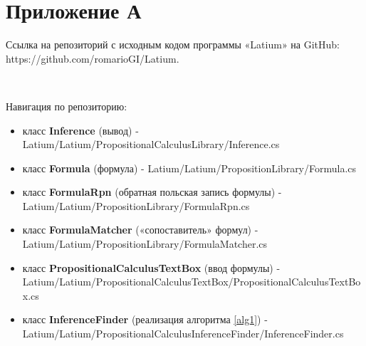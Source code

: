 \documentclass[a4paper,12pt]{article}
\theoremstyle{definition}
\begin{document}
	\section*{Приложение А}
	Ссылка на репозиторий с исходным кодом программы «Latium» на GitHub: https://github.com/romarioGI/Latium.
	
	~
	
	Навигация по репозиторию:
	\begin{itemize}
		\item класс \textbf{Inference} (вывод) - \newline Latium/Latium/PropositionalCalculusLibrary/Inference.cs
		
		\item класс \textbf{Formula} (формула) - \newline
		Latium/Latium/PropositionLibrary/Formula.cs
		
		\item класс \textbf{FormulaRpn} (обратная польская запись формулы) - \newline
		Latium/Latium/PropositionLibrary/FormulaRpn.cs
		
		\item класс \textbf{FormulaMatcher} («сопоставитель» формул) - \newline
		Latium/Latium/PropositionLibrary/FormulaMatcher.cs
		
		\item класс \textbf{PropositionalCalculusTextBox} (ввод формулы) - \newline
		Latium/Latium/PropositionalCalculusTextBox/PropositionalCalculusTextBox.cs
		
		\item класс \textbf{InferenceFinder} (реализация алгоритма \ref{alg1}) - \newline
		Latium/Latium/PropositionalCalculusInferenceFinder/InferenceFinder.cs
		
	\end{itemize}
	
\end{document}
